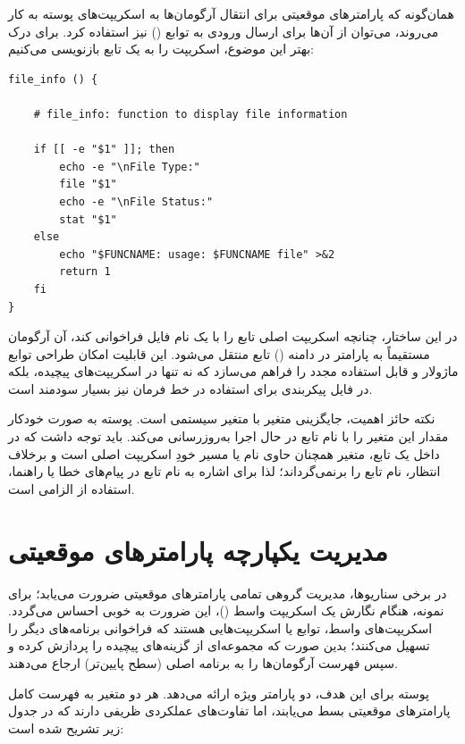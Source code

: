 همان‌گونه که پارامترهای موقعیتی برای انتقال آرگومان‌ها به اسکریپت‌های پوسته به کار می‌روند، می‌توان از آن‌ها برای ارسال ورودی به توابع () نیز استفاده کرد. برای درک بهتر این موضوع، اسکریپت  را به یک تابع بازنویسی می‌کنیم:

\begin{latin}
\begin{lstlisting}
file_info () {

    # file_info: function to display file information

    if [[ -e "$1" ]]; then
        echo -e "\nFile Type:"
        file "$1"
        echo -e "\nFile Status:"
        stat "$1"
    else
        echo "$FUNCNAME: usage: $FUNCNAME file" >&2
        return 1
    fi
}
\end{lstlisting}
\end{latin}

در این ساختار، چنانچه اسکریپت اصلی تابع  را با یک نام فایل فراخوانی کند، آن آرگومان مستقیماً به پارامتر  در دامنه () تابع منتقل می‌شود. این قابلیت امکان طراحی توابع ماژولار و قابل استفاده مجدد را فراهم می‌سازد که نه تنها در اسکریپت‌های پیچیده، بلکه در فایل پیکربندی  برای استفاده در خط فرمان نیز بسیار سودمند است.

نکته حائز اهمیت، جایگزینی متغیر  با متغیر سیستمی  است. پوسته به صورت خودکار مقدار این متغیر را با نام تابع در حال اجرا به‌روزرسانی می‌کند. باید توجه داشت که در داخل یک تابع، متغیر  همچنان حاوی نام یا مسیر خودِ اسکریپت اصلی است و برخلاف انتظار، نام تابع را برنمی‌گرداند؛ لذا برای اشاره به نام تابع در پیام‌های خطا یا راهنما، استفاده از  الزامی است.

\section{مدیریت یکپارچه پارامترهای موقعیتی}

در برخی سناریوها، مدیریت گروهی تمامی پارامترهای موقعیتی ضرورت می‌یابد؛ برای نمونه، هنگام نگارش یک اسکریپت واسط ()، این ضرورت به خوبی احساس می‌گردد. اسکریپت‌های واسط، توابع یا اسکریپت‌هایی هستند که فراخوانی برنامه‌های دیگر را تسهیل می‌کنند؛ بدین صورت که مجموعه‌ای از گزینه‌های پیچیده را پردازش کرده و سپس فهرست آرگومان‌ها را به برنامه اصلی (سطح پایین‌تر) ارجاع می‌دهند.

پوسته برای این هدف، دو پارامتر ویژه ارائه می‌دهد. هر دو متغیر به فهرست کامل پارامترهای موقعیتی بسط می‌یابند، اما تفاوت‌های عملکردی ظریفی دارند که در جدول زیر تشریح شده است:

